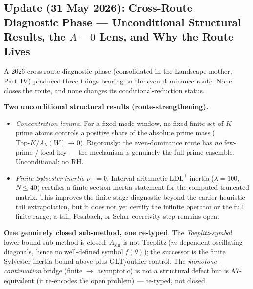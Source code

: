 \documentclass[11pt,a4paper]{article}
\theoremstyle{remark}
\theoremstyle{plain}
\begin{document}
\subsection{Update (31 May 2026): Cross-Route Diagnostic Phase --- Unconditional Structural Results, the \texorpdfstring{$\Lambda=0$}{Lambda=0} Lens, and Why the Route Lives}

A 2026 cross-route diagnostic phase (consolidated in the Landscape mother, Part~IV)
produced three things bearing on the even-dominance route. None closes the route,
and none changes its conditional-reduction status.

\medskip\noindent\textbf{Two unconditional structural results (route-strengthening).}
\begin{itemize}[leftmargin=*]
  \item \emph{Concentration lemma.} For a fixed mode window, no fixed finite set of
    $K$ prime atoms controls a positive share of the absolute prime mass
    ($\mathrm{Top}\text{-}K/A_\lambda(W)\to 0$). Rigorously: the even-dominance
    route has \emph{no} few-prime / local key --- the mechanism is genuinely the
    full prime ensemble. Unconditional; no RH.
  \item \emph{Finite Sylvester inertia $\nu_-=0$.} Interval-arithmetic
    $\mathrm{LDL}^\top$ inertia ($\lambda=100$, $N\le 40$) certifies a
    finite-section inertia statement for the computed truncated matrix. This
    improves the finite-stage diagnostic beyond the earlier heuristic tail
    extrapolation, but it does not yet certify the infinite operator or the full
    finite range; a tail, Feshbach, or Schur coercivity step remains open.
\end{itemize}

\medskip\noindent\textbf{One genuinely closed sub-method, one re-typed.}
The \emph{Toeplitz-symbol} lower-bound sub-method is closed: $A_{\sin}$ is not
Toeplitz ($m$-dependent oscillating diagonals, hence no well-defined symbol
$f(\theta)$); the successor is the finite Sylvester-inertia bound above plus
GLT/outlier control. The \emph{monotone-continuation} bridge (finite $\to$
asymptotic) is not a structural defect but is A7-equivalent (it re-encodes the
open problem) --- re-typed, not closed.
\end{document}
